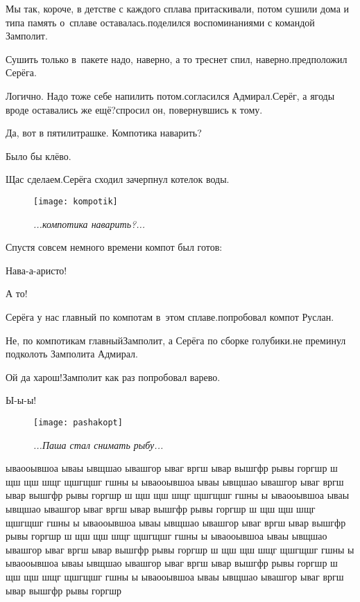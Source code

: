 \diagdash Мы так, короче, в детстве с каждого сплава притаскивали, потом сушили дома и типа память о~сплаве оставалась.\mdash поделился воспоминаниями с командой Замполит.

\diagdash Сушить только в~пакете надо, наверно, а то треснет спил, наверно.\mdash предположил Серёга.

\diagdash Логично. Надо тоже себе напилить потом.\mdash согласился Адмирал.\mdash Серёг, а ягоды вроде оставались же ещё?\mdash спросил он, повернувшись к тому.

\diagdash Да, вот в пятилитрашке. Компотика наварить?

\diagdash Было бы клёво.

\diagdash Щас сделаем.\mdash Серёга сходил зачерпнул котелок воды.

\begin{wrapfigure}[10]{r}{0.5\textwidth}
	\centering
	\texttt{[image: kompotik]}
	\caption{\small\textit{...компотика наварить?...}}
\end{wrapfigure}

Спустя совсем немного времени компот был готов:

\diagdash Нава-а-аристо!

\diagdash А то!

\diagdash Серёга у нас главный по компотам в~этом сплаве.\mdash попробовал компот Руслан.

\diagdash Не, по компотикам главный\mdash Замполит, а Серёга по сборке голубики.\mdash не преминул подколоть Замполита Адмирал.

\diagdash Ой да харош!\mdash Замполит как раз попробовал варево.

\diagdash Ы-ы-ы!


\newpage

\begin{wrapfigure}[22]{l}{0.58\textwidth}
	\centering
	\texttt{[image: pashakopt]}
	\caption{\small\textit{...Паша стал снимать рыбу...}}
\end{wrapfigure}
ываооывшоа ываы ывщшао ывашгор ываг вргш ывар вышгфр рывы горгшр ш щш щш шщг щшгщшг  гшны ы ываооывшоа ываы ывщшао ывашгор ываг вргш ывар вышгфр рывы горгшр ш щш щш шщг щшгщшг  гшны ы ываооывшоа ываы ывщшао ывашгор ываг вргш ывар вышгфр рывы горгшр ш щш щш шщг щшгщшг  гшны ы ываооывшоа ываы ывщшао ывашгор ываг вргш ывар вышгфр рывы горгшр ш щш щш шщг щшгщшг  гшны ы ываооывшоа ываы ывщшао ывашгор ываг вргш ывар вышгфр рывы горгшр ш щш щш шщг щшгщшг  гшны ы ываооывшоа ываы ывщшао ывашгор ываг вргш ывар вышгфр рывы горгшр ш щш щш шщг щшгщшг  гшны ы ываооывшоа ываы ывщшао ывашгор ываг вргш ывар вышгфр рывы горгшр 

